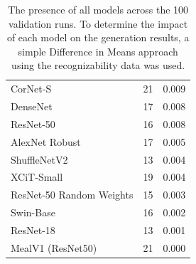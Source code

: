 \documentclass[pdflatex,sn-mathphys-num]{sn-jnl}%
\theoremstyle{thmstyleone}%
\theoremstyle{thmstyletwo}%
\theoremstyle{thmstylethree}%
\begin{document}
\begin{appendices}
\begin{table}
\begin{tabular}{lll}
        CorNet-S                  & 21          & 0.009               \\
        DenseNet                  & 17          & 0.008               \\
        ResNet-50                 & 16          & 0.008               \\
        AlexNet Robust            & 17          & 0.005               \\
        ShuffleNetV2              & 13          & 0.004               \\
        XCiT-Small                & 19          & 0.004               \\
        ResNet-50 Random Weights  & 15          & 0.003               \\
        Swin-Base                 & 16          & 0.002               \\
        ResNet-18                 & 13          & 0.001               \\
        MealV1 (ResNet50)         & 21          & 0.000
        \end{tabular}
        \label{tab:mixed_model_sets}
        \caption{
        The presence of all models across the 100 validation runs.
        To determine the impact of each model on the generation results, a simple Difference in Means approach using the recognizability data was used.
        }
    \end{table}

\end{appendices}
\end{document}
